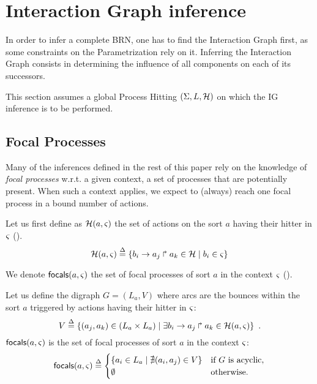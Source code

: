 \section{Interaction Graph inference}

In order to infer a complete BRN, one has to find the Interaction Graph first, as some constraints on the Parametrization rely on it. Inferring the Interaction Graph consists in determining the influence of all components on each of its successors.



This section assumes a global Process Hitting $(\Sigma,L,\mathcal{H})$ on which the IG inference is to be
performed.

\subsection{Focal Processes}

Many of the inferences defined in the rest of this paper rely on the knowledge of \emph{focal
processes} w.r.t. a given context, \ie{} a set of processes that are potentially present.
When such a context applies, we expect to (always) reach one focal process in a bound number of
actions.

Let us first define as $\mathcal{H}(a,\varsigma)$ the set of actions on the sort $a$ having their hitter in
$\varsigma$ ().
\begin{equation}
\mathcal{H}(a,\varsigma) \stackrel{\Delta}= \{ b_i\rightarrow a_j\Rsh a_k\in\mathcal{H} \mid b_i\in\varsigma \}
\label{eq:PHa-ctx}
\end{equation}

We denote $\mathsf{focals}(a,\varsigma)$ the set of focal processes of sort $a$ in the context $\varsigma$
().

\begin{definition}\label{def:focals}
Let us define the digraph $G = (L_a, V)$ where arcs are the bounces within the sort $a$
triggered by actions having their hitter in $\varsigma$:
\[V \stackrel{\Delta}= \{(a_j,a_k)\in (L_a \times L_a) \mid 
			\exists b_i\rightarrow a_j\Rsh a_k\in \mathcal{H}(a,\varsigma)\}\enspace.\]
$\mathsf{focals}(a,\varsigma)$ is the set of focal processes of sort $a$ in the context $\varsigma$:
\[
\mathsf{focals}(a,\varsigma) \stackrel{\Delta}=
\begin{cases}
\{ a_i \in L_a \mid \nexists (a_i,a_j)\in V\} & \text{if $G$ is acyclic},\\
\emptyset & \text{otherwise.}\\
\end{cases}
\]
\end{definition}


